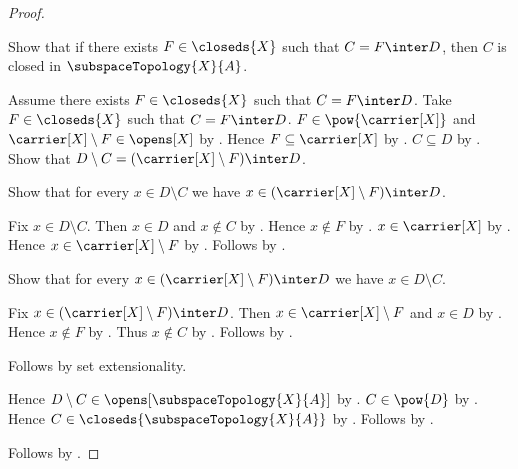 \begin{proof}
\begin{subproof}
    \end{subproof}
    Show that if there exists $F\in\closeds{X}$ such that $C=F\inter D$,
        then $C$ is closed in $\subspaceTopology{X}{A}$.
    \begin{subproof}
        Assume there exists $F\in\closeds{X}$ such that $C=F\inter D$.
        Take $F\in\closeds{X}$ such that $C=F\inter D$.
        $F\in\pow{\carrier[X]}$ and
            $\carrier[X]\setminus F\in\opens[X]$
            by .
        Hence $F\subseteq\carrier[X]$ by .
        $C\subseteq D$ by .
        Show that
            $D\setminus C=(\carrier[X]\setminus F)\inter D$.
        \begin{subproof}
            Show that for every $x\in D\setminus C$ we have
                $x\in(\carrier[X]\setminus F)\inter D$.
            \begin{subproof}
                Fix $x\in D\setminus C$.
                Then $x\in D$ and $x\notin C$ by .
                Hence $x\notin F$ by .
                $x\in\carrier[X]$ by .
                Hence $x\in\carrier[X]\setminus F$
                    by .
                Follows by .
            \end{subproof}
            Show that for every
                $x\in(\carrier[X]\setminus F)\inter D$ we have
                $x\in D\setminus C$.
            \begin{subproof}
                Fix $x\in(\carrier[X]\setminus F)\inter D$.
                Then $x\in\carrier[X]\setminus F$ and $x\in D$
                    by .
                Hence $x\notin F$ by .
                Thus $x\notin C$ by .
                Follows by .
            \end{subproof}
            Follows by set extensionality.
        \end{subproof}
        Hence $D\setminus C\in\opens[\subspaceTopology{X}{A}]$
            by .
        $C\in\pow{D}$ by .
        Hence $C\in\closeds{\subspaceTopology{X}{A}}$
            by .
        Follows by .
    \end{subproof}
    Follows by \auto.
\end{proof}

